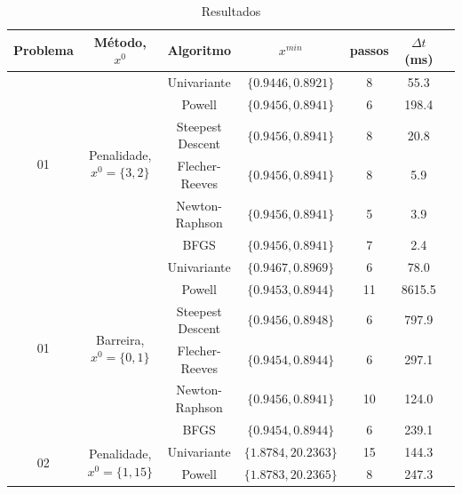 \documentclass[10pt, a4paper]{article}
\begin{document}
\begin{table}[H]
      \small
      \centering
      \caption{Resultados}
      \begin{tabular}{c|c|c|c|c|c|c}
            Problema & M\'etodo, $x^0$  & Algoritmo & $x^{min}$ & passos & $\Delta t$(ms) \\
            \hline
            \multirow{6}{*}{01} & \multirow{6}{*}{Penalidade, $x^0=\{3,2\}$} & Univariante       & $\{0.9446,0.8921\}$ & 8 & 55.3  \\
                                                            & & Powell            & $\{0.9456,0.8941\}$ & 6 & 198.4 \\
                                                            & & Steepest Descent  & $\{0.9456,0.8941\}$ & 8 & 20.8  \\
                                                            & & Flecher-Reeves    & $\{0.9456,0.8941\}$ & 8 & 5.9   \\
                                                            & & Newton-Raphson    & $\{0.9456,0.8941\}$ & 5 & 3.9   \\
                                                            & & BFGS              & $\{0.9456,0.8941\}$ & 7 & 2.4   \\
            \hline
            \multirow{6}{*}{01} & \multirow{6}{*}{Barreira, $x^0=\{0,1\}$} & Univariante         & $\{0.9467,0.8969\}$ & 6  & 78.0   \\
                                                            & & Powell            & $\{0.9453,0.8944\}$ & 11 & 8615.5 \\
                                                            & & Steepest Descent  & $\{0.9456,0.8948\}$ & 6  & 797.9  \\
                                                            & & Flecher-Reeves    & $\{0.9454,0.8944\}$ & 6  & 297.1  \\
                                                            & & Newton-Raphson    & $\{0.9456,0.8941\}$ & 10 & 124.0  \\
                                                            & & BFGS              & $\{0.9454,0.8944\}$ & 6  & 239.1  \\
            \hline
            \multirow{6}{*}{02} & \multirow{6}{*}{Penalidade, $x^0=\{1,15\}$} & Univariante       & $\{1.8784,20.2363\}$ & 15 & 144.3   \\
                                                            & & Powell            & $\{1.8783,20.2365\}$ & 8  & 247.3   \\

\end{tabular}
\end{table}
\end{document}
